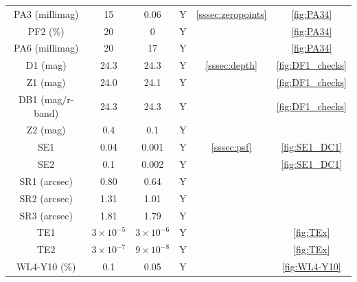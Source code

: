 \documentclass[\docopts]{\docclass}
\begin{document}
\begin{table}
\begin{tabular}{|c|c|c|c|c|c|}
\hline
PA3 (millimag) & 15 & 0.06  & Y  & \ref{sssec:zeropoints} & \ref{fig:PA34}\\
PF2 (\%) & 20 & 0 & Y  &  & \ref{fig:PA34}\\
PA6 (millimag) & 20 & 17 & Y  &  & \ref{fig:PA34}\\
\hline
D1 (mag) & 24.3 & 24.3 & Y & \ref{sssec:depth} & \ref{fig:DF1_checks}\\
Z1 (mag) & 24.0 & 24.1 & Y & & \ref{fig:DF1_checks}\\
DB1 (mag/r-band) & 24.3 & 24.3 & Y &  & \ref{fig:DF1_checks}\\
Z2 (mag) & 0.4 & 0.1 & Y &  & \\
\hline
SE1 & 0.04 & 0.001 & Y & \ref{sssec:psf} & \ref{fig:SE1_DC1}\\
SE2 & 0.1 & 0.002 & Y & & \ref{fig:SE1_DC1}\\
SR1 (arcsec) & 0.80 & 0.64 & Y & & \\
SR2 (arcsec) & 1.31 & 1.01 & Y & & \\
SR3 (arcsec) & 1.81 & 1.79 & Y & &\\
TE1 & $3 \times 10^{-5}$ & $3\times 10^{-6}$ & Y & & \ref{fig:TEx}\\
TE2 & $3 \times 10^{-7}$ & $9\times 10^{-8}$ & Y & & \ref{fig:TEx}\\
\hline
WL4-Y10 (\%) & 0.1 & 0.05 & Y & & \ref{fig:WL4-Y10}\\

\end{tabular}
\end{table}
\end{document}

